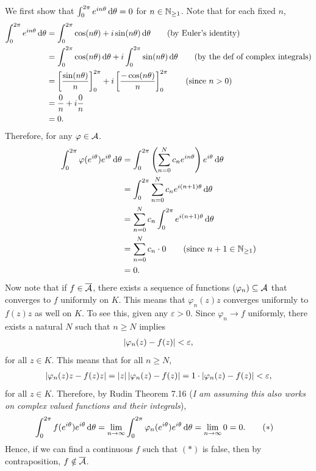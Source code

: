 \documentclass[12pt]{article}
\begin{document}
\begin{fproof}[5]
We first show that \(\int_{0}^{2 \pi} e^{i n \theta} \mathop{}\!\mathrm{d}\theta = 0\) for \(n \in \mathbb {N}_{\geq 1}\).
Note that for each fixed \(n\),
\begin{align*}
    \int_{0}^{2 \pi} e^{i n \theta} \mathop{}\!\mathrm{d}\theta 
    & = \int_{0}^{2 \pi} \cos(n \theta) + i \sin(n \theta) \mathop{}\!\mathrm{d}\theta \tag{by Euler's identity} \\
    &= \int_{0}^{2 \pi} \cos(n \theta) \mathop{}\!\mathrm{d}\theta + i \int_{0}^{2 \pi} \sin(n \theta) \mathop{}\!\mathrm{d}\theta \tag{by the def of complex integrals}\\
    &= \left[ \frac{\sin(n \theta)}{n} \right]_{0}^{2 \pi} + i \left[ \frac{-\cos(n \theta)}{n} \right]_{0}^{2 \pi} \tag{since \(n > 0\)}\\
    &= \frac{0}{n} + i \frac{0}{n}\\
    &=0.
\end{align*}
Therefore, for any \(\varphi \in \mathcal{A}\).
\begin{align*}
    \int_{0}^{2 \pi} \varphi(e^{i  \theta})e^{i \theta} \dth
    &= \int_{0}^{2 \pi} \pare{\sum_{n=0}^{N} c_ne^{in \theta}}e^{i \theta} \dth\\
    &= \int_{0}^{2 \pi} \sum_{n=0}^{N} c_n e^{i (n+1) \theta} \dth\\
    &= \sum_{n=0}^{N} c_n \int_{0}^{2 \pi} e^{i (n+1) \theta} \dth\\
    &= \sum_{n=0}^{N} c_n \cdot 0 \tag{since \(n+1 \in \N_{\geq 1}\)}\\
    &= 0.
\end{align*}
Now note that if \(f \in \overline{\mathcal{A}}\), there exists a sequence of functions \((\varphi_n) \subseteq \mathcal{A}\) that converges to \(f\) uniformly on \(K\).
This means that \(\varphi_n(z)z\) converges uniformly to \(f(z)z\) as well on \(K\).
To see this, given any \(\varepsilon > 0\).
Since \(\varphi_n \to f\) uniformly, there exists a natural \(N\) such that \(n \geq N\) implies
\begin{align*}
    \left\lvert \varphi_n(z) - f(z) \right\rvert < \varepsilon,
\end{align*}
for all \(z \in K\).
This means that for all \(n \geq N\),
\begin{align*}
    \left\lvert \varphi_n(z)z - f(z)z \right\rvert = \left\lvert z \right\rvert\left\lvert \varphi_n(z) - f(z) \right\rvert = 1 \cdot \left\lvert \varphi_n(z) - f(z) \right\rvert < \varepsilon,
\end{align*}
for all \(z \in K\).
Therefore, by Rudin Theorem 7.16 (\textit{I am assuming this also works on complex valued functions and their integrals}),
\begin{align*}
    \int_{0}^{2 \pi} f(e^{i  \theta})e^{i \theta} \mathop{}\!\mathrm{d}\theta
    &= \lim_{n \to \infty} \int_{0}^{2 \pi}  \varphi_n(e^{i  \theta})e^{i  \theta} \mathop{}\!\mathrm{d}\theta = \lim_{n \to \infty} 0 = 0. \tag{\(\ast\)}
\end{align*}
Hence, if we can find a continuous \(f\) such that \((\ast)\) is false, then by contraposition, \(f \notin \overline{\mathcal{A}}\).


\end{fproof}
\end{document}
